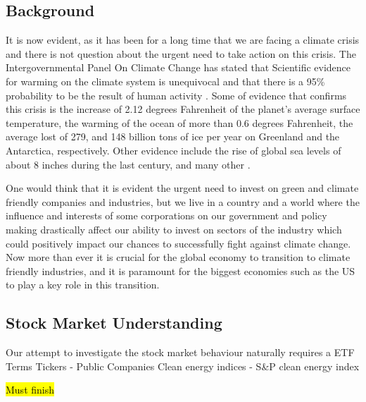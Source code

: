 \documentclass[sigconf, nonacm]{acmart}
\begin{document}
\subsection{Background}
\begin{flushleft}
It is now evident, as it has been for a long time that we are facing a climate crisis and there is not question about the urgent need to take action on this crisis. The Intergovernmental Panel On Climate Change has stated that Scientific evidence for warming on the climate system is unequivocal and that there is a 95\% probability to be the result of human activity \cite{nasa_2021}.  Some of evidence that confirms this crisis is the increase of 2.12 degrees Fahrenheit  of the planet's average surface temperature, the warming of the ocean of more than 0.6 degrees Fahrenheit, the average lost of 279, and 148 billion tons of ice per year on Greenland and the Antarctica, respectively. Other evidence include the rise of global sea levels of about 8 inches during the last century, and many other  \cite{nasa_2021}.
\end{flushleft}

\begin{flushleft}
One would think that it is evident the urgent need to invest on green and climate friendly companies and industries, but we live in a country and a world where the influence and interests of some corporations on our government and policy making drastically affect our ability to invest on sectors of the industry which could positively impact our chances to successfully fight against climate change. Now more than ever it is crucial for the global economy to transition to climate friendly industries, and it is paramount for the biggest economies such as the US to play a key role in this transition. 
\end{flushleft}


\subsection{Stock Market Understanding}
Our attempt to investigate the stock market behaviour naturally requires a 
    ETF Terms 
Tickers - Public Companies
Clean energy indices - S\&P clean energy index

\hl{Must finish}
\end{document}
